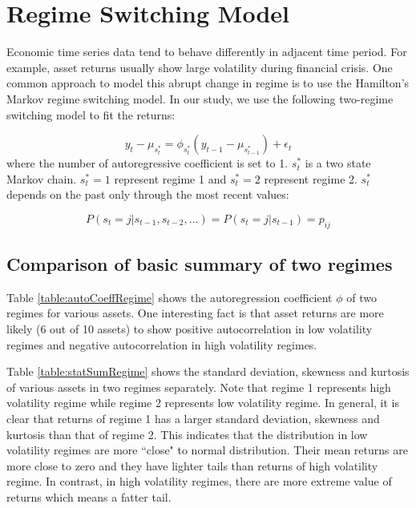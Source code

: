 \documentclass[12pt]{article}
\begin{document}
\section{Regime Switching Model}
\fi

Economic time series data tend to behave differently in adjacent time period. For example, asset returns
usually show large volatility during financial crisis. One common approach to model this abrupt change in regime is to use the Hamilton's Markov regime switching model. In our study, we use the following two-regime switching model to fit the returns:

\begin{equation}
y_t - \mu_{s^*_t} = \phi_{s^*_t} (y_{t-1} - \mu_{s^*_{t-1}}) + \epsilon_t
\end{equation}
where the number of autoregressive coefficient is set to 1. $s^*_t$ is a two state Markov chain. $s^*_t = 1$ represent regime 1 and $s^*_t = 2$ represent regime 2. $s^*_t$ depends on the past only through the most recent values:

\begin{equation}
P(s_t = j|s_{t-1}, s_{t-2}, \dots) = P(s_t = j|s_{t-1})  = p_{ij}
\end{equation}

\subsection{Comparison of basic summary of two regimes}

Table \ref{table:autoCoeffRegime} shows the autoregression coefficient $\phi$ of two regimes for various assets. One interesting fact is that asset returns are more likely (6 out of 10 assets) to show positive autocorrelation in low volatility regimes and negative autocorrelation in high volatility regimes.

Table \ref{table:statSumRegime} shows the standard deviation, skewness and kurtosis of various assets in two regimes separately. Note that regime 1 represents high volatility regime while regime 2 represents low volatility regime. In general, it is clear that returns of regime 1 has a larger standard deviation, skewness and kurtosis than that of regime 2. This indicates that the distribution in low volatility regimes are more ``close" to normal distribution. Their mean returns are more close to zero and they have lighter tails than returns of high volatility regime. In contrast, in high volatility regimes, there are more extreme value of returns which means a fatter tail.
\end{document}
